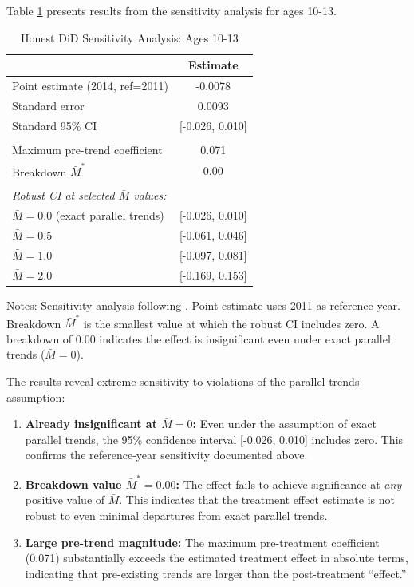 Table \ref{tab:honest_did} presents results from the sensitivity analysis for ages 10-13.

\begin{table}[H]
\centering
\caption{Honest DiD Sensitivity Analysis: Ages 10-13}
\label{tab:honest_did}
\begin{threeparttable}
\begin{tabular}{lc}
\toprule
& Estimate \\
\midrule
Point estimate (2014, ref=2011) & -0.0078 \\
Standard error & 0.0093 \\
Standard 95\% CI & [-0.026, 0.010] \\
\\
Maximum pre-trend coefficient & 0.071 \\
Breakdown $\bar{M}^*$ & 0.00 \\
\\
\midrule
\multicolumn{2}{l}{\textit{Robust CI at selected $\bar{M}$ values:}} \\
\quad $\bar{M} = 0.0$ (exact parallel trends) & [-0.026, 0.010] \\
\quad $\bar{M} = 0.5$ & [-0.061, 0.046] \\
\quad $\bar{M} = 1.0$ & [-0.097, 0.081] \\
\quad $\bar{M} = 2.0$ & [-0.169, 0.153] \\
\bottomrule
\end{tabular}
\begin{tablenotes}
\footnotesize
\item Notes: Sensitivity analysis following \citet{RambachanRoth2023}. Point estimate uses 2011 as reference year. Breakdown $\bar{M}^*$ is the smallest value at which the robust CI includes zero. A breakdown of 0.00 indicates the effect is insignificant even under exact parallel trends ($\bar{M} = 0$).
\end{tablenotes}
\end{threeparttable}
\end{table}

The results reveal extreme sensitivity to violations of the parallel trends assumption:

\begin{enumerate}
\item \textbf{Already insignificant at $\bar{M} = 0$:} Even under the assumption of exact parallel trends, the 95\% confidence interval [-0.026, 0.010] includes zero. This confirms the reference-year sensitivity documented above.

\item \textbf{Breakdown value $\bar{M}^* = 0.00$:} The effect fails to achieve significance at \textit{any} positive value of $\bar{M}$. This indicates that the treatment effect estimate is not robust to even minimal departures from exact parallel trends.

\item \textbf{Large pre-trend magnitude:} The maximum pre-treatment coefficient (0.071) substantially exceeds the estimated treatment effect in absolute terms, indicating that pre-existing trends are larger than the post-treatment ``effect.''
\end{enumerate}

